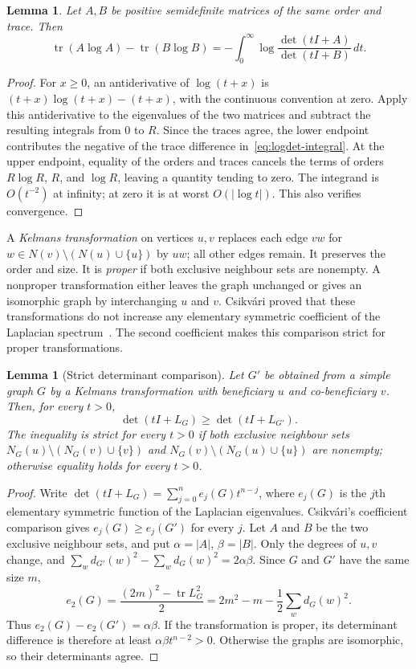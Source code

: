 \documentclass[11pt,a4paper,reqno]{amsart}
\newtheorem{lemma}[theorem]{Lemma}
\theoremstyle{remark}
\newcommand{\tr}{\operatorname{tr}}
\numberwithin{equation}{section}
\begin{document}
\begin{samepage}
\begin{lemma}\label{lem:integral}
Let $A,B$ be positive semidefinite matrices of the same order and trace.
Then
\begin{equation}\label{eq:logdet-integral}
 \tr(A\log A)-\tr(B\log B)
 =-\int_0^\infty\log\frac{\det(tI+A)}{\det(tI+B)}\,dt.
\end{equation}
\end{lemma}
\end{samepage}
\begin{proof}
For $x\ge0$, an antiderivative of $\log(t+x)$ is
$(t+x)\log(t+x)-(t+x)$, with the continuous convention at zero.
Apply this antiderivative to the eigenvalues of the two matrices and
subtract the resulting integrals from $0$ to $R$.
Since the traces agree, the lower endpoint contributes the negative
of the trace difference in~\eqref{eq:logdet-integral}.
At the upper endpoint, equality of the orders and traces cancels the terms of orders
$R\log R$, $R$, and $\log R$, leaving a quantity tending to zero.
The integrand is $O(t^{-2})$ at infinity; at zero it is at worst
$O(|\log t|)$. This also verifies convergence.
\end{proof}

A \emph{Kelmans transformation} on vertices $u,v$ replaces each edge $vw$ for
$w\in N(v)\setminus(N(u)\cup\{u\})$ by $uw$; all other edges remain.
It preserves the order and size. It is \emph{proper} if both exclusive
neighbour sets are nonempty. A nonproper transformation either leaves the
graph unchanged or gives an isomorphic graph by interchanging $u$ and $v$.
Csikv\'ari proved that these transformations do not increase any elementary
symmetric coefficient of the Laplacian spectrum~\cite[Theorem~8.1]{Csikvari2011}.
The second coefficient makes this comparison strict for proper transformations.

\begin{lemma}[Strict determinant comparison]\label{lem:kelmans-determinant}
Let $G'$ be obtained from a simple graph $G$ by a Kelmans transformation
with beneficiary $u$ and co-beneficiary $v$. Then, for every $t>0$,
\[
 \det(tI+L_G)\ge\det(tI+L_{G'}).
\]
The inequality is strict for every $t>0$ if both exclusive neighbour sets
$N_G(u)\setminus(N_G(v)\cup\{v\})$ and
$N_G(v)\setminus(N_G(u)\cup\{u\})$ are nonempty; otherwise equality
holds for every $t>0$.
\end{lemma}
\begin{proof}
Write $\det(tI+L_G)=\sum_{j=0}^n e_j(G)t^{n-j}$, where $e_j(G)$ is
the $j$th elementary symmetric function of the Laplacian eigenvalues.
Csikv\'ari's coefficient comparison gives $e_j(G)\ge e_j(G')$ for every $j$.
Let $A$ and $B$ be the two exclusive neighbour sets, and put
$\alpha=|A|$, $\beta=|B|$. Only the degrees of $u,v$ change, and
$\sum_w d_{G'}(w)^2-\sum_w d_G(w)^2=2\alpha\beta$.
Since $G$ and $G'$ have the same size $m$,
\[
 e_2(G)=\frac{(2m)^2-\tr L_G^2}{2}
       =2m^2-m-\frac12\sum_w d_G(w)^2.
\]
Thus $e_2(G)-e_2(G')=\alpha\beta$. If the transformation is proper,
its determinant difference is therefore
at least $\alpha\beta t^{n-2}>0$. Otherwise the graphs are isomorphic,
so their determinants agree.
\end{proof}
\end{document}
